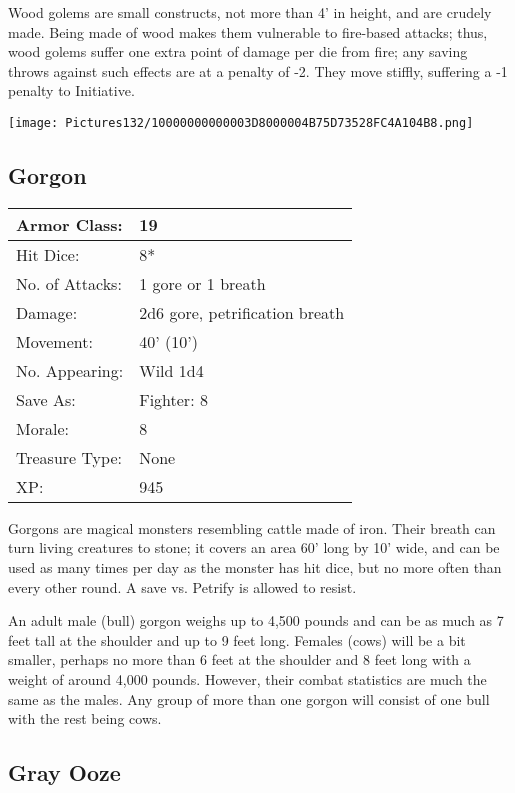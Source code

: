 \documentclass[a4paper,twoside,openany,10pt]{book}
\begin{document}
\begin{multicols}{2}
Wood golems are small constructs, not more than 4' in height, and are crudely made. Being made of wood makes them vulnerable to fire-based attacks; thus, wood golems suffer one extra point of damage per die from fire; any saving throws against such effects are at a penalty of -2. They move stiffly, suffering a -1 penalty to Initiative.

\begin{center}
	\texttt{[image: Pictures132/10000000000003D8000004B75D73528FC4A104B8.png]}
\end{center}

\subsection*{Gorgon}\label{gorgon}

\begin{tabularx}{0.48\textwidth}{@{}lX@{}}
Armor Class: & 19 \\\hline
Hit Dice: & 8* \\\hline
No. of Attacks: & 1 gore or 1 breath \\\hline
Damage: & 2d6 gore, petrification breath \\\hline
Movement: & 40' (10') \\\hline
No. Appearing: & Wild 1d4 \\\hline
Save As: & Fighter: 8 \\\hline
Morale: & 8 \\\hline
Treasure Type: & None \\\hline
XP: & 945 \\\hline
\end{tabularx}\medskip

Gorgons are magical monsters resembling cattle made of iron. Their breath can turn living creatures to stone; it covers an area 60' long by 10' wide, and can be used as many times per day as the monster has hit dice, but no more often than every other round. A save vs. Petrify is allowed to resist. 

An adult male (bull) gorgon weighs up to 4,500 pounds and can be as much as 7 feet tall at the shoulder and up to 9 feet long. Females (cows) will be a bit smaller, perhaps no more than 6 feet at the shoulder and 8 feet long with a weight of around 4,000 pounds. However, their combat statistics are much the same as the males. Any group of more than one gorgon will consist of one bull with the rest being cows.

\subsection*{Gray Ooze}\label{gray-ooze}


\end{multicols}
\end{document}
